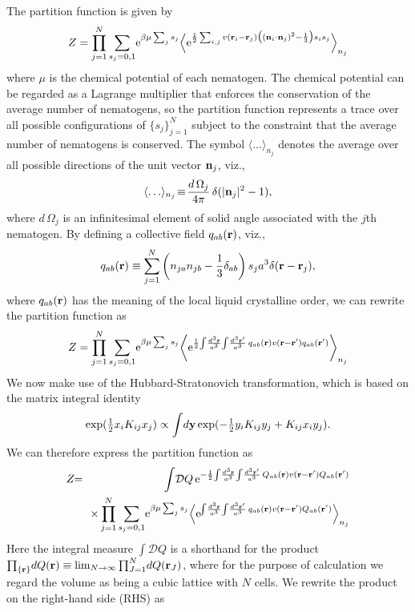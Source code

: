\documentclass[jcp,aps,twocolumn,showpacs,supergroupedaddress,epsfig,amsmath,amssymb,eqsecnum]{revtex4}
\def\nv{{\bf n}}
\newcommand{\be}{\begin{equation}}
\newcommand{\ee}{\end{equation}}
\newcommand{\ba}{\begin{eqnarray}}
\newcommand{\ea}{\end{eqnarray}}
\newcommand{\rv}{{\bf r}}
\newcommand{\yv}{{\bf y}}
\begin{document}
The partition function is given by 
\be
\label{eq:Zorig}
Z = \prod_{j=1}^{N} \sum_{s_j=0,1} \! {\rm e}^{\beta \mu \sum_j s_j} 
\Big\langle 
{\rm e}^{\frac{1}{2}\sum_{i,j} 
v(\rv_i - \rv_j) 
\big( \left( {\bf n}_i \cdot {\bf n}_j \right)^2 - \frac{1}{3} \big) 
s_i s_j }
\Big\rangle_{n_j}
\ee
where $\mu$ is the chemical potential of each nematogen. The chemical potential can be regarded as a Lagrange multiplier that enforces the conservation of the average number of nematogens, so the partition function represents a trace over all possible configurations of $\{ s_j \}_{j=1}^{N}$ subject to the constraint that the average number of nematogens is conserved. 
The symbol $\langle \ldots \rangle_{n_j}$ denotes the average over all possible directions of the unit vector $\nv_j$, viz., 
\be
\langle \ldots \rangle_{n_j} \!\equiv\! 
\frac{d\,\Omega_j}{4\pi} \,
\delta(|\nv_j|^2-1),  
\ee 
where $d\,\Omega_j$ is an infinitesimal element of solid angle associated with the $j$th nematogen. 
By defining a collective field $q_{ab}({\bf r})$, viz., 
\be
q_{ab}({\bf r}) 
\equiv
\sum_{j=1}^{N} \left( n_{j a} n_{j b} - \frac{1}{3}\delta_{ab} \right) s_j a^3 
\delta({\bf r} - {\bf r}_j), 
\ee
where $q_{ab}(\rv)$ has the meaning of the local liquid crystalline order, we can rewrite the partition function as 
\be
\label{eq:Z}
Z = \prod_{j=1}^{N} \sum_{s_j=0,1} \! {\rm e}^{\beta \mu \sum_j s_j} \! 
\left\langle 
{\rm e}^{\frac{1}{2} \!\int\! \frac{d^3\rv}{a^3} \! \int \! \frac{d^3\rv'}{a^3} \, 
q_{ab}(\rv) v(\rv - \rv') q_{ab}(\rv')}
\right\rangle_{n_j}
\ee
We now make use of the Hubbard-Stratonovich transformation, which is based on the matrix integral identity
\be
\exp (\tfrac{1}{2} x_i K_{ij} x_j) \propto\int \! d\yv \exp(-\tfrac{1}{2} y_i K_{ij} y_j + K_{ij} x_i y_j). 
\ee
We can therefore express the partition function as 
\ba
\label{eq:Zdual}
Z &\!\!=\!\!& \int\!\mathcal{D}Q \, 
{\rm e}^{-\frac{1}{2} \!\int\! \frac{d^3\rv}{a^3} \! \int \! \frac{d^3\rv'}{a^3} \, 
Q_{ab}(\rv) v(\rv - \rv') Q_{ab}(\rv')}
\\
&&\times
\prod_{j=1}^{N} 
\sum_{s_j=0,1} \! 
{\rm e}^{\beta \mu \sum_{j} s_j}
\Big\langle
{\rm e}^{\!\int\! \frac{d^3\rv}{a^3} \! \int \! \frac{d^3\rv'}{a^3} \, 
q_{ab}(\rv) v(\rv-\rv') Q_{ab}(\rv')}
\Big\rangle_{n_j}
\nonumber
\ea
Here the integral measure $\int \!\mathcal{D}Q$ is a shorthand for the product $\prod_{\{\rv\}}\! dQ(\rv) \equiv \lim_{N\rightarrow\infty}\prod_{J=1}^{N} \! dQ(\rv_J)$, where for the purpose of calculation we regard the volume as being a cubic lattice with $N$ cells. 
We rewrite the product on the right-hand side (RHS) as
\end{document}
